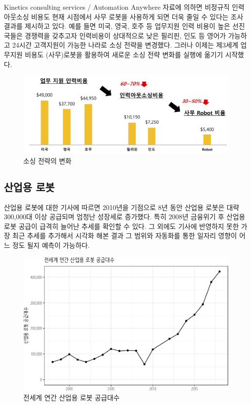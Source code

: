 \documentclass[smallextended]{svjour3}       %
\begin{document}
Kinetics consulting services / Automation Anywhere 자료에 의하면
비정규직 인력 아웃소싱 비용도 현재 시점에서 사무 로봇을 사용하게 되면
더욱 줄일 수 있다는 조사결과를 제시하고 있다. 예를 들면 미국, 영국, 호주
등 업무지원 인력 비용이 높은 선진국들은 경쟁력을 갖추고자 인력비용이
상대적으로 낮은 필리핀, 인도 등 영어가 가능하고 24시간 고객지원이 가능한
나라로 소싱 전략을 변경했다. 그러나 이제는 제3세계 업무지원 비용도
(사무)로봇을 활용하여 새로운 소싱 전략 변화를 실행에 옮기기 시작했다.

\begin{figure}

{\centering \includegraphics[width=1\linewidth]{fig/the-end-of-outsourcing} 

}

\caption{소싱 전략의 변화}\label{fig:unnamed-chunk-3}
\end{figure}

\hypertarget{industrial-robot}{%
\subsection{산업용 로봇}\label{industrial-robot}}

산업용 로봇에 대한 기사\cite{ahlstrom_2019}에 따르면 2010년을 기점으로
8년 동안 산업용 로봇은 대략 300,000대 이상 공급되며 엄청난 성장세로
증가했다. 특히 2008년 금융위기 후 산업용 로봇 공급이 급격히 늘어난
추세를 확인할 수 있다. 그 외에도 기사에 반영하지 못한 가장 최근 추세를
추가해서 시각화 해본 결과 그 범위와 자동화를 통한 일자리 영향이 어느
정도 될지 예측이 가능하다.

\begin{figure}

{\centering \includegraphics[width=1\linewidth]{paper_files/figure-latex/industrial-robot-1} 

}

\caption{전세계 연간 산업용 로봇 공급대수}\label{fig:industrial-robot}
\end{figure}
\end{document}
